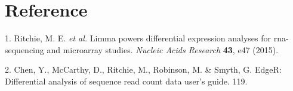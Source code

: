 \documentclass[
]{article}
\newenvironment{cslreferences}%
  {}%
  {\par}
\begin{document}
\hypertarget{bibliography}{%
\section*{Reference}\label{bibliography}}

\hypertarget{refs}{}
\begin{cslreferences}
\leavevmode\hypertarget{ref-LimmaPowersDiRitchi2015}{}%
1. Ritchie, M. E. \emph{et al.} Limma powers differential expression analyses for rna-sequencing and microarray studies. \emph{Nucleic Acids Research} \textbf{43}, e47 (2015).

\leavevmode\hypertarget{ref-EdgerDifferenChen}{}%
2. Chen, Y., McCarthy, D., Ritchie, M., Robinson, M. \& Smyth, G. EdgeR: Differential analysis of sequence read count data user's guide. 119.
\end{cslreferences}
\end{document}
